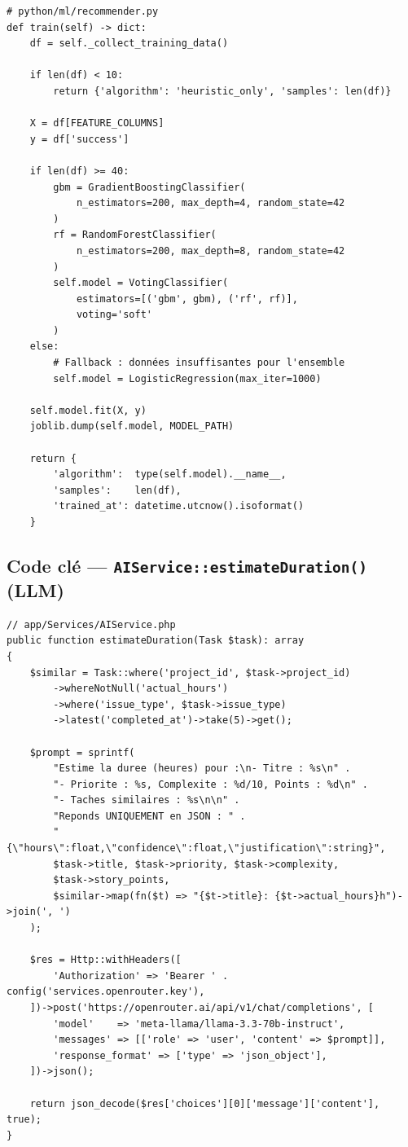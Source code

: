 \begin{lstlisting}[style=pythonstyle,caption={FastAPI Recommender — Pipeline d'entraînement ML},label={lst:ml_train}]
# python/ml/recommender.py
def train(self) -> dict:
    df = self._collect_training_data()

    if len(df) < 10:
        return {'algorithm': 'heuristic_only', 'samples': len(df)}

    X = df[FEATURE_COLUMNS]
    y = df['success']

    if len(df) >= 40:
        gbm = GradientBoostingClassifier(
            n_estimators=200, max_depth=4, random_state=42
        )
        rf = RandomForestClassifier(
            n_estimators=200, max_depth=8, random_state=42
        )
        self.model = VotingClassifier(
            estimators=[('gbm', gbm), ('rf', rf)],
            voting='soft'
        )
    else:
        # Fallback : données insuffisantes pour l'ensemble
        self.model = LogisticRegression(max_iter=1000)

    self.model.fit(X, y)
    joblib.dump(self.model, MODEL_PATH)

    return {
        'algorithm':  type(self.model).__name__,
        'samples':    len(df),
        'trained_at': datetime.utcnow().isoformat()
    }
\end{lstlisting}

\subsection{Code clé — \texttt{AIService::estimateDuration()} (LLM)}

\begin{lstlisting}[style=phpstyle,caption={AIService::estimateDuration() — Estimation LLM},label={lst:llm_estimate}]
// app/Services/AIService.php
public function estimateDuration(Task $task): array
{
    $similar = Task::where('project_id', $task->project_id)
        ->whereNotNull('actual_hours')
        ->where('issue_type', $task->issue_type)
        ->latest('completed_at')->take(5)->get();

    $prompt = sprintf(
        "Estime la duree (heures) pour :\n- Titre : %s\n" .
        "- Priorite : %s, Complexite : %d/10, Points : %d\n" .
        "- Taches similaires : %s\n\n" .
        "Reponds UNIQUEMENT en JSON : " .
        "{\"hours\":float,\"confidence\":float,\"justification\":string}",
        $task->title, $task->priority, $task->complexity,
        $task->story_points,
        $similar->map(fn($t) => "{$t->title}: {$t->actual_hours}h")->join(', ')
    );

    $res = Http::withHeaders([
        'Authorization' => 'Bearer ' . config('services.openrouter.key'),
    ])->post('https://openrouter.ai/api/v1/chat/completions', [
        'model'    => 'meta-llama/llama-3.3-70b-instruct',
        'messages' => [['role' => 'user', 'content' => $prompt]],
        'response_format' => ['type' => 'json_object'],
    ])->json();

    return json_decode($res['choices'][0]['message']['content'], true);
}
\end{lstlisting}

